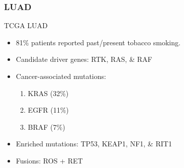 \documentclass{beamer}
\begin{document}
            \begin{frame}
                \frametitle{LUAD}

                \begin{block}{TCGA LUAD \cite{LUAD-01}}
                    \begin{itemize}
                        \item 81\% patients reported past/present tobacco smoking.
                        \item Candidate driver genes: RTK, RAS, \& RAF
                        \item Cancer-associated mutations:
                        \begin{enumerate}
                            \item KRAS (32\%)
                            \item EGFR (11\%)
                            \item BRAF (7\%)
                        \end{enumerate}
                        \item Enriched mutations: TP53, KEAP1, NF1, \& RIT1
                        \item Fusions: ROS + RET
                    \end{itemize}
                \end{block}
            \end{frame}
\end{document}
